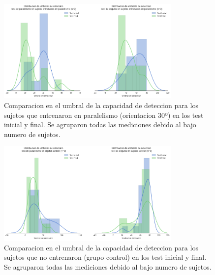 \documentclass{article}
\begin{document}
\begin{figure}
    \centering
    \includegraphics[width=0.8\textwidth]{Imagenes/TransferenciaHistogramasParalelismoAntesVsDespues.png}
    \caption{Comparacion en el umbral de la capacidad de deteccion para los sujetos que entrenaron en paralelismo (orientacion 30º) en los test inicial y final. Se agruparon todas las mediciones debido al bajo numero de sujetos.}
    \label{fig:histogramasAntesVsDespuesParalelismo}
\end{figure}

\begin{figure}
    \centering
    \includegraphics[width=0.8\textwidth]{Imagenes/TransferenciaHistogramasControlAntesVsDespues.png}
    \caption{Comparacion en el umbral de la capacidad de deteccion para los sujetos que no entrenaron (grupo control) en los test inicial y final. Se agruparon todas las mediciones debido al bajo numero de sujetos.}
    \label{fig:histogramasAntesVsDespuesControl}
\end{figure}
\end{document}
